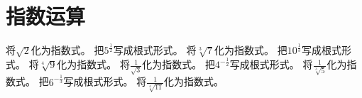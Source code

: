\documentclass{ctexart}
\begin{document}


\section{指数运算}

\begin{Exercise}[title={基础根式与指数式互换练习}, label={ex:basic - radical - exponential}]
    \Question 将\(\sqrt{2}\)化为指数式。
    \Question 把\(5^{\frac{1}{2}}\)写成根式形式。
    \Question 将\(\sqrt[3]{7}\)化为指数式。
    \Question 把\(10^{\frac{1}{3}}\)写成根式形式。
    \Question 将\(\sqrt[4]{9}\)化为指数式。
    \Question 将\(\frac{1}{\sqrt{3}}\)化为指数式。
    \Question 把\(4^{-\frac{1}{2}}\)写成根式形式。
    \Question 将\(\frac{1}{\sqrt[3]{5}}\)化为指数式。
    \Question 把\(6^{-\frac{1}{3}}\)写成根式形式。
    \Question 将\(\frac{1}{\sqrt[4]{11}}\)化为指数式。
\end{Exercise}
\end{document}
